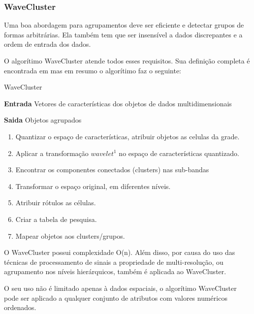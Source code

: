 		
		\subsubsection{WaveCluster}
			Uma boa abordagem para agrupamentos deve ser eficiente e detectar grupos de formas arbitrárias. Ela também tem que ser insensível a dados discrepantes e a ordem de entrada dos dados.
			
			O algorítimo WaveCluster atende todos esses requisitos. Sua definição completa é encontrada em \cite{wavecluster} mas em resumo o algorítimo faz o seguinte:
\begin{algorithm}
\caption{WaveCluster}
\textbf{Entrada} Vetores de características dos objetos de dados multidimensionais

\textbf{Saida} Objetos agrupados
\begin{enumerate}
\item Quantizar o espaço de características, atribuir objetos as celulas da grade.
\item Aplicar a transformação $wavelet^1$ no espaço de características quantizado.
\item Encontrar os componentes conectados (clusters) nas sub-bandas
\item Transformar o espaço original, em diferentes níveis.
\item Atribuir rótulos as células.
\item Criar a tabela de pesquisa.
\item Mapear objetos aos clusters/grupos.
\end{enumerate}
\end{algorithm}

O WaveCluster possui complexidade O(n). Além disso, por causa do uso das técnicas de processamento de sinais a propriedade de multi-resolução, ou agrupamento nos níveis hierárquicos, também é aplicada ao WaveCluster.

O seu uso não é limitado apenas à dados espaciais, o algorítimo WaveCluster pode ser aplicado a qualquer conjunto de atributos com valores numéricos ordenados.
	
%
%
%
